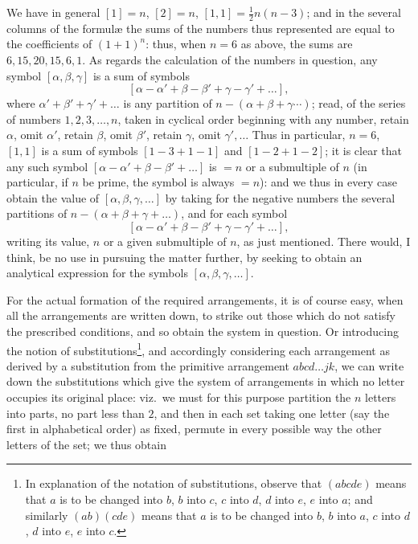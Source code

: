 \documentclass[11pt,a4paper]{article}
\begin{document}
We have in general $[1] = n$, $[2] = n$, $[1, 1] = \tfrac{1}{2}n(n - 3)$; and in the several columns of the formul\ae{} the sums of the numbers thus represented are equal to the coefficients of $(1 + 1)^{n}$: thus, when $n = 6$ as above, the sums are $6, 15, 20, 15, 6, 1$. As regards the calculation of the numbers in question, any symbol $[\alpha, \beta, \gamma]$ is a sum of symbols
\[
[\alpha - \alpha' + \beta - \beta' + \gamma - \gamma' + \ldots],
\]
where $\alpha' + \beta' + \gamma' + \ldots$ is any partition of $n - (\alpha + \beta + \gamma\cdots)$; read, of the series of numbers $1, 2, 3, \ldots, n$, taken in cyclical order beginning with any number, retain $\alpha$, omit $\alpha'$, retain $\beta$, omit $\beta'$, retain $\gamma$, omit $\gamma', \ldots$ Thus in particular, $n = 6$, $[1, 1]$ is a sum of symbols $[1 - 3 + 1 - 1]$ and $[1 - 2 + 1 - 2]$; it is clear that any such symbol $[\alpha - \alpha' + \beta - \beta' + \ldots]$ is $= n$ or a submultiple of $n$ (in particular, if $n$ be prime, the symbol is always $= n$): and we thus in every case obtain the value of $[\alpha, \beta, \gamma, \ldots]$ by taking for the negative numbers the several partitions of $n - (\alpha + \beta + \gamma + \ldots)$, and for each symbol
\[
[\alpha - \alpha' + \beta - \beta' + \gamma - \gamma' + \ldots],
\]
writing its value, $n$ or a given submultiple of $n$, as just mentioned. There would, I think, be no use in pursuing the matter further, by seeking to obtain an analytical expression for the symbols $[\alpha, \beta, \gamma, \ldots]$.

\medskip

For the actual formation of the required arrangements, it is of course easy, when all the arrangements are written down, to strike out those which do not satisfy the prescribed conditions, and so obtain the system in question. Or introducing the notion of substitutions\footnote{In explanation of the notation of substitutions, observe that $(abcde)$ means that $a$ is to be changed into $b$, $b$ into $c$, $c$ into $d$, $d$ into $e$, $e$ into $a$; and similarly $(ab)(cde)$ means that $a$ is to be changed into $b$, $b$ into $a$, $c$ into $d$, $d$ into $e$, $e$ into $c$.}, and accordingly considering each arrangement as derived by a substitution from the primitive arrangement $abcd\ldots jk$, we can write down the substitutions which give the system of arrangements in which no letter occupies its original place: viz.\ we must for this purpose partition the $n$ letters into parts, no part less than $2$, and then in each set taking one letter (say the first in alphabetical order) as fixed, permute in every possible way the other letters of the set; we thus obtain
\end{document}
